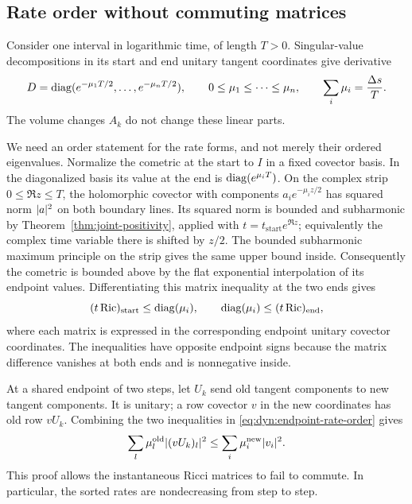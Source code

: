 \subsection{Rate order without commuting matrices}

Consider one interval in logarithmic time, of length $T>0$.
Singular-value decompositions in its start and end unitary tangent
coordinates give derivative
\begin{equation}
 D=\operatorname{diag}(e^{-\mu_1T/2},\ldots,e^{-\mu_nT/2}),\qquad
 0\le\mu_1\le\cdots\le\mu_n,\qquad
 \sum_i\mu_i=\frac{\Delta s}{T}.
 \label{eq:dyn:diagonal-rates}
\end{equation}
The volume changes $A_k$ do not change these linear parts.

We need an order statement for the rate forms, and not merely their
ordered eigenvalues.  Normalize the cometric at the start to $I$ in a
fixed covector basis.  In the diagonalized basis its value at the end
is $\operatorname{diag}(e^{\mu_iT})$.  On the complex strip $0\le\Re z\le T$, the
holomorphic covector with components $a_i e^{-\mu_i z/2}$ has squared
norm $\lvert a\rvert^2$ on both boundary lines.  Its squared norm is bounded
and subharmonic by Theorem~\ref{thm:joint-positivity}, applied with
$t=t_{\mathrm{start}}e^{\Re z}$; equivalently the complex time variable
there is shifted by $z/2$.  The bounded subharmonic maximum principle
on the strip gives the same upper bound inside.  Consequently the
cometric is bounded above by the flat exponential interpolation of its
endpoint values.  Differentiating this matrix inequality at the two
ends gives
\begin{equation}
 (t\operatorname{Ric})_{\mathrm{start}}\le\operatorname{diag}(\mu_i),\qquad
 \operatorname{diag}(\mu_i)\le(t\operatorname{Ric})_{\mathrm{end}},
 \label{eq:dyn:endpoint-rate-order}
\end{equation}
where each matrix is expressed in the corresponding endpoint unitary
covector coordinates.  The inequalities have opposite endpoint signs
because the matrix difference vanishes at both ends and is
nonnegative inside.

At a shared endpoint of two steps, let $U_k$ send old tangent
components to new tangent components.  It is unitary; a row covector
$v$ in the new coordinates has old row $vU_k$.  Combining the two
inequalities in \eqref{eq:dyn:endpoint-rate-order} gives
\begin{equation}
 \sum_l\mu_l^{\mathrm{old}}\lvert(vU_k)_l\rvert^2
 \le\sum_i\mu_i^{\mathrm{new}}\lvert v_i\rvert^2.
 \label{eq:dyn:loewner-jump}
\end{equation}
This proof allows the instantaneous Ricci matrices to fail to commute.
In particular, the sorted rates are nondecreasing from step to step.

